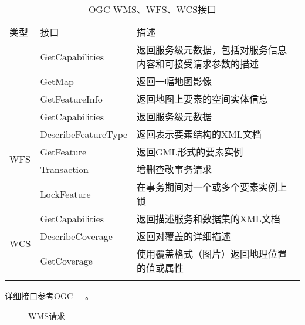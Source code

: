\begin{table}
    \centering
    \caption{OGC WMS、WFS、WCS接口}
    \label{tab:OGC-WMS-WFS-WCS}
    \begin{threeparttable}
        \begin{tabular}{ l | l l}
            \Xhline{1.5pt}
            类型 & 接口 & 描述 \\
            \Xhline{1.5pt}
            \multirow{3}{*}{WMS} & GetCapabilities & \multicolumn{1}{m{0.6\columnwidth}}{返回服务级元数据，包括对服务信息内容和可接受请求参数的描述} \\
            \cline{2-3}
            & GetMap & 返回一幅地图影像 \\
            \cline{2-3}
            & GetFeatureInfo & 返回地图上要素的空间实体信息 \\
            \hline
            \multirow{5}{*}{WFS} & GetCapabilities & 返回服务级元数据 \\
            \cline{2-3}
            & DescribeFeatureType & 返回表示要素结构的XML文档 \\
            \cline{2-3}
            & GetFeature & 返回GML形式的要素实例 \\
            \cline{2-3}
            & Transaction & 增删查改事务请求 \\
            \cline{2-3}
            & LockFeature & 在事务期间对一个或多个要素实例上锁 \\
            \hline
            \multirow{3}{*}{WCS} & GetCapabilities & 返回描述服务和数据集的XML文档 \\
            \cline{2-3}
            & DescribeCoverage & 返回对覆盖的详细描述 \\
            \cline{2-3}
            & GetCoverage & 使用覆盖格式（图片）返回地理位置的值或属性 \\
            \Xhline{1.5pt}
        \end{tabular}
        \begin{tablenotes}
            \footnotesize
            \item 详细接口参考OGC~\cite{OGC-WMS}~\cite{OGC-WFS}~\cite{OGC-WCS}。
        \end{tablenotes}
    \end{threeparttable}
\end{table}



\begin{figure}[!htbp]
    \centering

    \hfill

    \caption{WMS请求}
    \label{fig:wms-example}
\end{figure}

